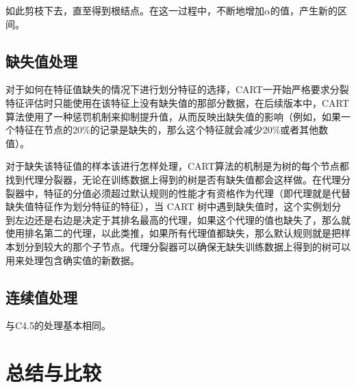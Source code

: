 \documentclass[fontset=windows]{article}
\begin{document}
如此剪枝下去，直至得到根结点。在这一过程中，不断地增加$\alpha$的值，产生新的区间。


\subsection{缺失值处理}

对于如何在特征值缺失的情况下进行划分特征的选择，CART一开始严格要求分裂特征评估时只能使用在该特征上没有缺失值的那部分数据，在后续版本中，CART算法使用了一种惩罚机制来抑制提升值，从而反映出缺失值的影响（例如，如果一个特征在节点的20\%的记录是缺失的，那么这个特征就会减少20\%或者其他数值）。

对于缺失该特征值的样本该进行怎样处理，CART算法的机制是为树的每个节点都找到代理分裂器，无论在训练数据上得到的树是否有缺失值都会这样做。在代理分裂器中，特征的分值必须超过默认规则的性能才有资格作为代理（即代理就是代替缺失值特征作为划分特征的特征），当 CART 树中遇到缺失值时，这个实例划分到左边还是右边是决定于其排名最高的代理，如果这个代理的值也缺失了，那么就使用排名第二的代理，以此类推，如果所有代理值都缺失，那么默认规则就是把样本划分到较大的那个子节点。代理分裂器可以确保无缺失训练数据上得到的树可以用来处理包含确实值的新数据。

\subsection{连续值处理}

与C4.5的处理基本相同。

\section{总结与比较}
\end{document}
